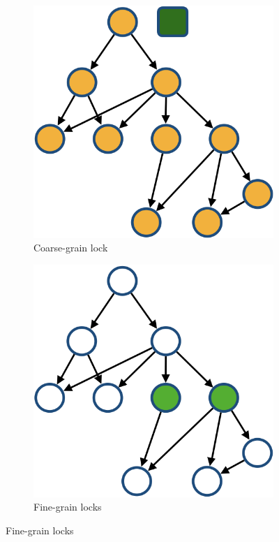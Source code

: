 




\begin{figure}[H]
    \captionsetup{justification=centering}
    \centering
    \begin{subfigure}{.49\textwidth}
        \centering
        \includegraphics[width=.7\columnwidth]{figures/CoarseGrainedLockingTree}
        \caption{Coarse-grain lock}        
        \label{fig:fixedLockGrainsCoarse}
    \end{subfigure}
    \begin{subfigure}{.49\textwidth}
        \centering
        \includegraphics[width=.7\columnwidth]{figures/FineGrainLockingTree}
        \caption{Fine-grain locks}
        \label{fig:fixedLockGrainsFine}
    \end{subfigure}
    

\end{figure}
